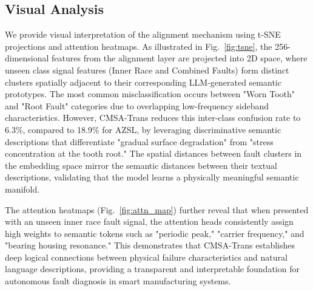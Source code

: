 \subsection{Visual Analysis}
We provide visual interpretation of the alignment mechanism using t-SNE projections and attention heatmaps. As illustrated in Fig.~\ref{fig:tsne}, the 256-dimensional features from the alignment layer are projected into 2D space, where unseen class signal features (Inner Race and Combined Faults) form distinct clusters spatially adjacent to their corresponding LLM-generated semantic prototypes. The most common misclassification occurs between "Worn Tooth" and "Root Fault" categories due to overlapping low-frequency sideband characteristics. However, CMSA-Trans reduces this inter-class confusion rate to 6.3\%, compared to 18.9\% for AZSL, by leveraging discriminative semantic descriptions that differentiate "gradual surface degradation" from "stress concentration at the tooth root." The spatial distances between fault clusters in the embedding space mirror the semantic distances between their textual descriptions, validating that the model learns a physically meaningful semantic manifold.

The attention heatmaps (Fig.~\ref{fig:attn_map}) further reveal that when presented with an unseen inner race fault signal, the attention heads consistently assign high weights to semantic tokens such as "periodic peak," "carrier frequency," and "bearing housing resonance." This demonstrates that CMSA-Trans establishes deep logical connections between physical failure characteristics and natural language descriptions, providing a transparent and interpretable foundation for autonomous fault diagnosis in smart manufacturing systems.

